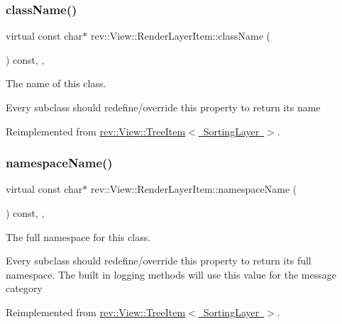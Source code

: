 \subsubsection{\texorpdfstring{className()}{className()}}
{\footnotesize\ttfamily virtual const char$\ast$ rev\+::\+View\+::\+Render\+Layer\+Item\+::class\+Name (\begin{DoxyParamCaption}{ }\end{DoxyParamCaption}) const\hspace{0.3cm}{\ttfamily [inline]}, {\ttfamily [override]}, {\ttfamily [virtual]}}



The name of this class. 

Every subclass should redefine/override this property to return its name 

Reimplemented from \mbox{\hyperlink{classrev_1_1_view_1_1_tree_item_a8a12a6ceece6cab7a2299da2b5e6a54b}{rev\+::\+View\+::\+Tree\+Item$<$ Sorting\+Layer $>$}}.

\mbox{\label{classrev_1_1_view_1_1_render_layer_item_a2b0a9658af4c9bcd14703e39d3917813}} 
\subsubsection{\texorpdfstring{namespaceName()}{namespaceName()}}
{\footnotesize\ttfamily virtual const char$\ast$ rev\+::\+View\+::\+Render\+Layer\+Item\+::namespace\+Name (\begin{DoxyParamCaption}{ }\end{DoxyParamCaption}) const\hspace{0.3cm}{\ttfamily [inline]}, {\ttfamily [override]}, {\ttfamily [virtual]}}



The full namespace for this class. 

Every subclass should redefine/override this property to return its full namespace. The built in logging methods will use this value for the message category 

Reimplemented from \mbox{\hyperlink{classrev_1_1_view_1_1_tree_item_a3bb552a87176f4b12848e43dfdd287b2}{rev\+::\+View\+::\+Tree\+Item$<$ Sorting\+Layer $>$}}.

\mbox{\label{classrev_1_1_view_1_1_render_layer_item_a47da9e3b2ab654727f724a951b061acf}} 
